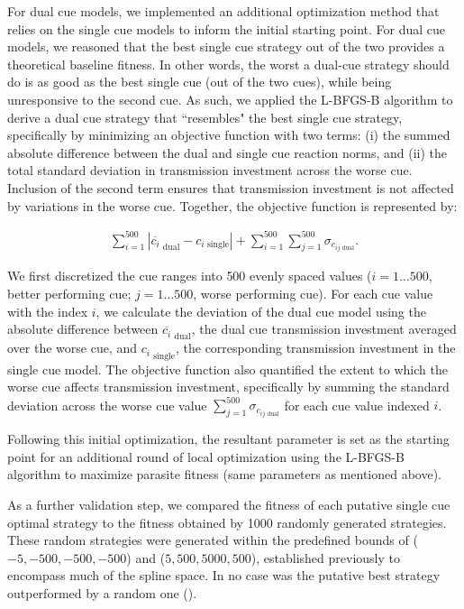 \documentclass[10pt,letterpaper]{article}
\begin{document}
For dual cue models, we implemented an additional optimization method that relies on the single cue models to inform the initial starting point. For dual cue models, we reasoned that the best single cue strategy out of the two provides a theoretical baseline fitness. In other words, the worst a dual-cue strategy should do is as good as the best single cue (out of the two cues), while being unresponsive to the second cue. As such, we applied the L-BFGS-B algorithm to derive a dual cue strategy that ``resembles" the best single cue strategy, specifically by minimizing an objective function with two terms: (i) the summed absolute difference between the dual and single cue reaction norms, and (ii) the total standard deviation in transmission investment across the worse cue. Inclusion of the second term ensures that transmission investment is not affected by variations in the worse cue. Together, the objective function is represented by:

\begin{eqnarray}
\label{eq:init_objective_function}
    \sum_{i=1}^{500} \left|\overline{c_{i}}_\text{ dual}- c_{i \text{ single}}\right|+\sum_{i=1}^{500}\sum_{j=1}^{500}\sigma_{c_{ij \text{ dual}}}.
\end{eqnarray}

 We first discretized the cue ranges into 500 evenly spaced values ($i=1{\ldots}500$, better performing cue; $j=1{\ldots}500$, worse performing cue). For each cue value with the index $i$, we calculate the deviation of the dual cue model using the absolute difference between $\overline{c_i}_ \text{ dual}$, the dual cue transmission investment averaged over the worse cue, and ${c_i}_ \text{ single}$, the corresponding transmission investment in the single cue model. The objective function also quantified the extent to which the worse cue affects transmission investment, specifically by summing the standard deviation across the worse cue value $\sum_{j=1}^{500}\sigma_{c_{ij \text{ dual}}}$ for each cue value indexed $i$.\newline


Following this initial optimization, the resultant parameter is set as the starting point for an additional round of local optimization using the L-BFGS-B algorithm to maximize parasite fitness (same parameters as mentioned above).\newline


As a further validation step, we compared the fitness of each putative single cue optimal strategy to the fitness obtained by 1000 randomly generated strategies. These random strategies were generated within the predefined bounds of  (\(-5, -500, -500, -500\)) and (\(5, 500, 5000, 500\)), established previously to encompass much of the spline space. In no case was the putative best strategy outperformed by a random one (). %
\end{document}
